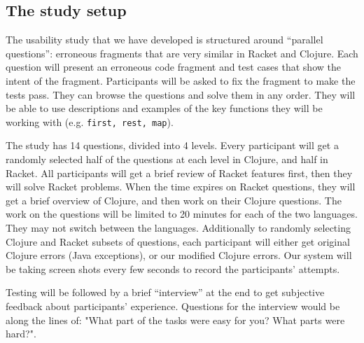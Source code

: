 \documentclass[submission,copyright,creativecommons]{eptcs}
\newcommand{\allcomments}[1]{{#1}}
\newcommand{\emcomment}[1]{{\bf \textcolor{ForestGreen}{\allcomments{{#1}}}}}
\newcommand{\thcomment}[1]{{\bf \textcolor{blue}{\allcomments{{#1}}}}}
\begin{document}
\subsection{The study setup}\label{sec:setup}

The usability study that we have developed is structured around ``parallel questions'': erroneous fragments that are very similar in 
Racket and Clojure. Each question will present an erroneous code fragment and test cases that show the intent of the fragment. 
Participants will be asked to fix the fragment to make the tests pass.
 They can browse the questions and solve them in any order.
They will be able to use descriptions and examples of the key functions they will be working with (e.g. {\tt first, rest, map}). %

The study has 14 questions, divided into 4 levels. 
Every participant will get a randomly selected half of the questions at each level in Clojure, and half in Racket. 
All participants will get a brief review of Racket features first, then they will solve Racket problems. When the time expires on Racket questions, 
they will get a brief overview of Clojure, and then work on their Clojure questions. 
The work on the questions will be limited to 20 minutes for each of the two languages. 
They may not switch between the languages. 
Additionally to randomly selecting Clojure and Racket subsets of questions, each participant will either get original Clojure
errors (Java exceptions), or our modified Clojure errors. 
Our system will be taking screen shots every few seconds to record the participants' attempts. 

Testing will be followed by a brief ``interview'' at the end to get subjective feedback about participants' experience. 
Questions for the interview would be along the lines of:  "What part of the tasks were easy for you? What parts were hard?".



	
	   
\end{document}
